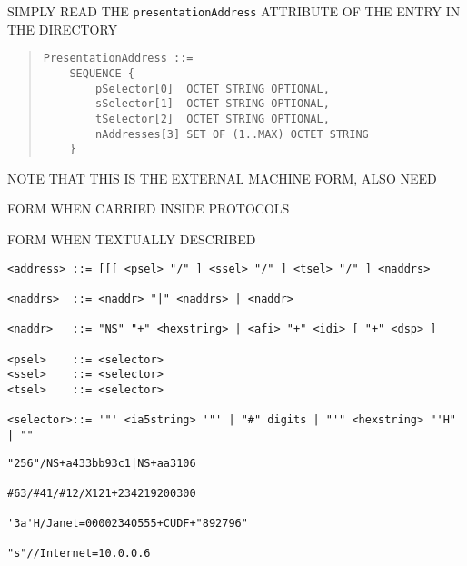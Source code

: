 \begin{bwslide}

\begin{nrtc}
\item	SIMPLY READ THE \verb"presentationAddress" ATTRIBUTE OF THE ENTRY IN
	THE DIRECTORY
\begin{quote}\small\begin{verbatim}
PresentationAddress ::=
    SEQUENCE {
        pSelector[0]  OCTET STRING OPTIONAL,
        sSelector[1]  OCTET STRING OPTIONAL,
        tSelector[2]  OCTET STRING OPTIONAL,
        nAddresses[3] SET OF (1..MAX) OCTET STRING
    }
\end{verbatim}\end{quote}

\item	NOTE THAT THIS IS THE EXTERNAL MACHINE FORM, ALSO NEED
    \begin{nrtc}
    \item	FORM WHEN CARRIED INSIDE PROTOCOLS

    \item	FORM WHEN TEXTUALLY DESCRIBED
    \end{nrtc}
\end{nrtc}
\end{bwslide}


\begin{bwslide}

\smaller
\begin{verbatim}
<address> ::= [[[ <psel> "/" ] <ssel> "/" ] <tsel> "/" ] <naddrs>

<naddrs>  ::= <naddr> "|" <naddrs> | <naddr>

<naddr>   ::= "NS" "+" <hexstring> | <afi> "+" <idi> [ "+" <dsp> ]

<psel>    ::= <selector>
<ssel>    ::= <selector>
<tsel>    ::= <selector>

<selector>::= '"' <ia5string> '"' | "#" digits | "'" <hexstring> "'H" | ""
\end{verbatim}
\end{bwslide}


\begin{bwslide}

\begin{verbatim}
"256"/NS+a433bb93c1|NS+aa3106

#63/#41/#12/X121+234219200300

'3a'H/Janet=00002340555+CUDF+"892796"

"s"//Internet=10.0.0.6
\end{verbatim}
\end{bwslide}


